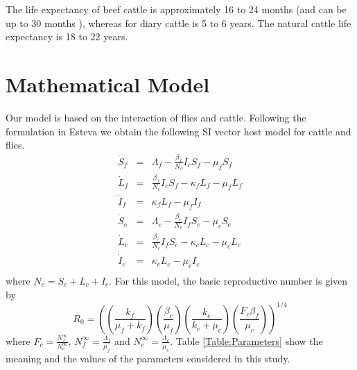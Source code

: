 \documentclass[preprint,12pt]{elsarticle}
\begin{document}
\noindent The life expectancy of beef cattle is approximately 16 to 24 months (and can be up to 30 months \cite{stanley:2003}), whereas for diary cattle is 5 to 6 years. The natural cattle life expectancy is 18 to 22 years.


\section{Mathematical Model}

\noindent Our model is based on the interaction of flies and cattle. Following the formulation in Esteva \cite{Esteva:1998} we obtain the following SI vector host model for cattle and flies.
\begin{equation}\label{Eq:SIvectorhostmodel}
\begin{array}{lcl}
\dot{S}_f&=&\Lambda_f-\frac{\beta_f}{N_c}I_cS_f-\mu_fS_f\\
\dot{L}_f&=&\frac{\beta_f}{N_c}I_cS_f-\kappa_fL_f-\mu_fL_f\\
\dot{I}_f&=&\kappa_fL_f-\mu_fI_f\\
\dot{S}_c&=&\Lambda_c-\frac{\beta_c}{N_c}I_fS_c-\mu_cS_c\\
\dot{L}_c&=&\frac{\beta_c}{N_c}I_fS_c-\kappa_cL_c-\mu_cL_c\\
\dot{I}_c&=&\kappa_cL_c-\mu_cI_c\\
\end{array}
\end{equation}
where $N_c=S_c+L_c+I_c$. For this model, the basic reproductive number is given by
 \begin{equation}
     R_0=\left(\left(\frac{k_f}{\mu_f+k_f}\right)\left(\frac{\beta_c}{\mu_f}\right)\left(\frac{k_c}{k_c+\mu_c}\right)\left(\frac{F_c\beta_f}{\mu_c} \right) \right)^{1/4}
 \end{equation}
 where $F_c=\frac{N_f^{\infty}}{N_c^{\infty}}$, $N_f^{\infty}=\frac{\Lambda_f}{\mu_f}$ and $N_c^{\infty}=\frac{\Lambda_c}{\mu_c}$. Table \ref{Table:Parameters} show the meaning and the values of the parameters considered in this study.
 

\end{document}
